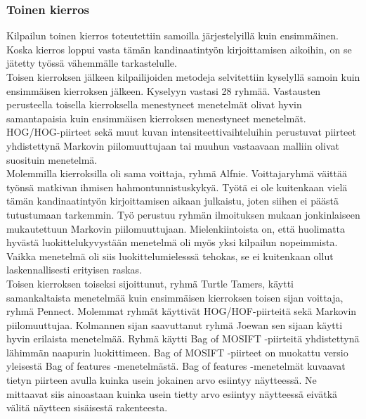 \newpage
\subsubsection {Toinen kierros}

Kilpailun toinen kierros toteutettiin samoilla järjestelyillä kuin ensimmäinen. Koska kierros loppui
vasta tämän kandinaatintyön kirjoittamisen aikoihin, on se jätetty työssä vähemmälle tarkastelulle.\\

Toisen kierroksen jälkeen kilpailijoiden metodeja selvitettiin kyselyllä samoin kuin ensimmäisen
kierroksen jälkeen. Kyselyyn vastasi 28 ryhmää. Vastausten perusteella toisella kierroksella menestyneet 
menetelmät olivat hyvin samantapaisia kuin ensimmäisen kierroksen menestyneet menetelmät. HOG/HOG-piirteet sekä muut
kuvan intensiteettivaihteluihin perustuvat piirteet yhdistettynä Markovin piilomuuttujaan tai muuhun
vastaavaan malliin olivat suosituin menetelmä. \citep{chalearn2}\\

Molemmilla kierroksilla oli sama voittaja, ryhmä Alfnie. 
Voittajaryhmä väittää työnsä matkivan ihmisen hahmontunnistuskykyä. Työtä ei ole kuitenkaan vielä tämän kandinaatintyön kirjoittamisen aikaan julkaistu,
 joten siihen ei päästä tutustumaan tarkemmin. Työ perustuu
ryhmän ilmoituksen mukaan jonkinlaiseen mukautettuun Markovin piilomuuttujaan. Mielenkiintoista on,
että huolimatta hyvästä luokittelukyvystään menetelmä oli myös yksi kilpailun nopeimmista. Vaikka menetelmä oli siis 
luokittelumielesssä tehokas, se ei kuitenkaan ollut laskennallisesti erityisen raskas. \citep{chalearn2}\\

Toisen kierroksen toiseksi sijoittunut, ryhmä Turtle Tamers, käytti samankaltaista menetelmää kuin 
ensimmäisen kierroksen toisen sijan voittaja, ryhmä Pennect. Molemmat ryhmät käyttivät HOG/HOF-piirteitä sekä Markovin piilomuuttujaa. 
Kolmannen sijan saavuttanut ryhmä Joewan sen sijaan käytti hyvin erilaista menetelmää. Ryhmä käytti Bag of MOSIFT -piirteitä 
yhdistettynä lähimmän naapurin luokittimeen. \citep{chalearn2} Bag of MOSIFT -piirteet on muokattu versio
yleisestä Bag of features -menetelmästä. Bag of features -menetelmät kuvaavat tietyn piirteen avulla
kuinka usein jokainen arvo esiintyy näytteessä. Ne mittaavat siis ainoastaan kuinka usein tietty arvo esiintyy näytteessä eivätkä 
välitä näytteen sisäisestä rakenteesta. \citep{bagoffeatures} \\

